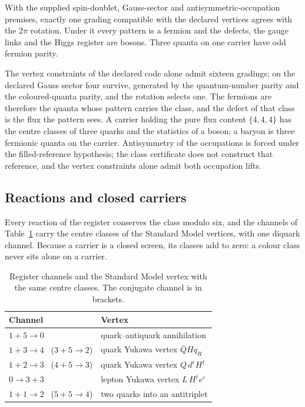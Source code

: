 \begin{proposition}
\label{prop:defect-statistics}
With the supplied spin-doublet, Gauss-sector and antisymmetric-occupation premises,
exactly one grading compatible with the declared vertices agrees with the $2\pi$
rotation. Under it every pattern is a fermion and the defects, the gauge links and
the Higgs register are bosons. Three quanta on one carrier have odd fermion parity.
\end{proposition}

The vertex constraints of the declared code alone admit sixteen gradings; on the declared Gauss sector four
survive, generated by the quantum-number parity and the coloured-quanta parity, and the
rotation selects one. The fermions are therefore the quanta whose pattern carries the class,
and the defect of that class is the flux the pattern sees. A carrier holding the pure flux
content $\{4,4,4\}$ has the centre classes of three quarks and the statistics of a boson; a
baryon is three fermionic quanta on the carrier. Antisymmetry of the occupations is forced
under the filled-reference hypothesis; the class certificate does not construct that reference,
and the vertex constraints alone admit both occupation lifts.

\subsection{Reactions and closed carriers}

Every reaction of the register conserves the class modulo six, and the channels of
Table~\ref{tab:defect-reactions} carry the centre classes of the Standard Model vertices,
with one diquark channel. Because a carrier is a closed screen, its classes add to zero:
a colour class never sits alone on a carrier.

\begin{table}[htbp]
\centering\small
\caption{Register channels and the Standard Model vertex with the same centre classes.
The conjugate channel is in brackets.}
\label{tab:defect-reactions}
\begin{tabular}{@{}ll@{}}
\toprule
Channel & Vertex\\
\midrule
$1+5\to0$ & quark--antiquark annihilation\\
$1+3\to4$ \ ($3+5\to2$) & quark Yukawa vertex $\bar Q H q_R$\\
$1+2\to3$ \ ($4+5\to3$) & quark Yukawa vertex $Q\,d^cH^\dagger$\\
$0\to3+3$ & lepton Yukawa vertex $L\,H^\dagger e^c$\\
$1+1\to2$ \ ($5+5\to4$) & two quarks into an antitriplet\\
\bottomrule
\end{tabular}
\end{table}

